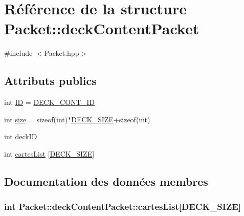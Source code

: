 \hypertarget{structPacket_1_1deckContentPacket}{}\section{Référence de la structure Packet\+:\+:deck\+Content\+Packet}
\label{structPacket_1_1deckContentPacket}


{\ttfamily \#include $<$Packet.\+hpp$>$}

\subsection*{Attributs publics}
\begin{DoxyCompactItemize}
\item 
int \hyperlink{structPacket_1_1deckContentPacket_a00cd7c008d480f9dd7e7347e8d6d0842}{I\+D} = \hyperlink{classPacket_ae91c1d355e4c8f0bef5f893747473661ac6762b082af175037f3df2c4079553df}{D\+E\+C\+K\+\_\+\+C\+O\+N\+T\+\_\+\+I\+D}
\item 
int \hyperlink{structPacket_1_1deckContentPacket_a35c756dcec8f7d81db66f2d188451f38}{size} = sizeof(int)$\ast$\hyperlink{Packet_8hpp_ab48a679225d82ec51e09e62d14313b34}{D\+E\+C\+K\+\_\+\+S\+I\+Z\+E}+sizeof(int)
\item 
int \hyperlink{structPacket_1_1deckContentPacket_a3964261af7fcc399035c6d6f78215619}{deck\+I\+D}
\item 
int \hyperlink{structPacket_1_1deckContentPacket_afe4a24bc025d967a88eceb0510cea04a}{cartes\+List} \mbox{[}\hyperlink{Packet_8hpp_ab48a679225d82ec51e09e62d14313b34}{D\+E\+C\+K\+\_\+\+S\+I\+Z\+E}\mbox{]}
\end{DoxyCompactItemize}


\subsection{Documentation des données membres}
\hypertarget{structPacket_1_1deckContentPacket_afe4a24bc025d967a88eceb0510cea04a}{}
\subsubsection[{cartes\+List}]{\setlength{\rightskip}{0pt plus 5cm}int Packet\+::deck\+Content\+Packet\+::cartes\+List\mbox{[}{\bf D\+E\+C\+K\+\_\+\+S\+I\+Z\+E}\mbox{]}}\label{structPacket_1_1deckContentPacket_afe4a24bc025d967a88eceb0510cea04a}
\hypertarget{structPacket_1_1deckContentPacket_a3964261af7fcc399035c6d6f78215619}{}
